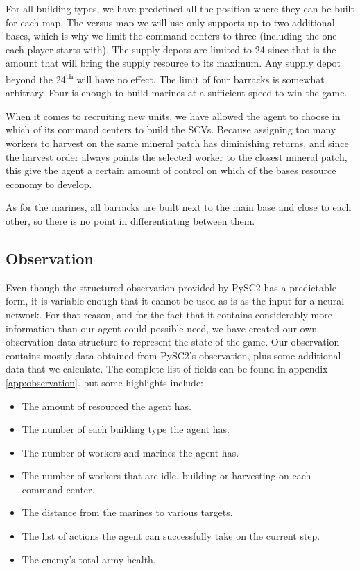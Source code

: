 For all building types, we have predefined all the position where they can be built for each map. The versus map we will use only supports up to two additional bases, which is why we limit the command centers to three (including the one each player starts with). The supply depots are limited to 24 since that is the amount that will bring the supply resource to its maximum. Any supply depot beyond the 24\textsuperscript{th} will have no effect. The limit of four barracks is somewhat arbitrary. Four is enough to build marines at a sufficient speed to win the game.

When it comes to recruiting new units, we have allowed the agent to choose in which of its command centers to build the SCVs. Because assigning too many workers to harvest on the same mineral patch has diminishing returns, and since the harvest order always points the selected worker to the closest mineral patch, this give the agent a certain amount of control on which of the bases resource economy to develop.

As for the marines, all barracks are built next to the main base and close to each other, so there is no point in differentiating between them.

\subsection{Observation}

Even though the structured observation provided by PySC2 has a predictable form, it is variable enough that it cannot be used as-is as the input for a neural network. For that reason, and for the fact that it contains considerably more information than our agent could possible need, we have created our own observation data structure to represent the state of the game. Our observation contains mostly data obtained from PySC2's observation, plus some additional data that we calculate. The complete list of fields can be found in appendix \ref{app:observation}. but some highlights include:

\begin{itemize}
    \item The amount of resourced the agent has.
    \item The number of each building type the agent has.
    \item The number of workers and marines the agent has.
    \item The number of workers that are idle, building or harvesting on each command center.
    \item The distance from the marines to various targets.
    \item The list of actions the agent can successfully take on the current step.
    \item The enemy's total army health.
\end{itemize}

